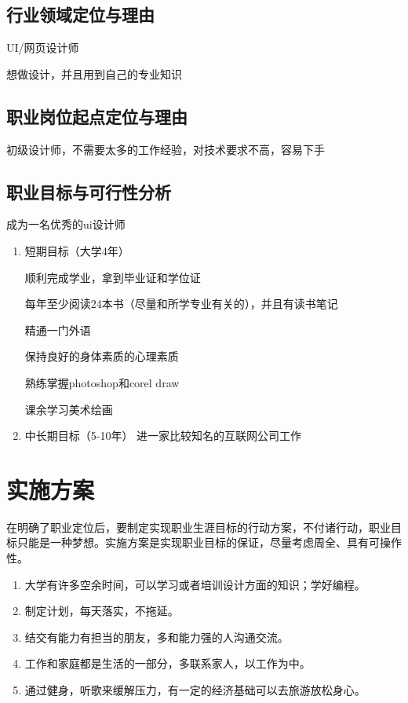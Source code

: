 \documentclass{article}
\begin{document}
\subsection{行业领域定位与理由}
UI/网页设计师\par
想做设计，并且用到自己的专业知识
\par
\subsection{职业岗位起点定位与理由}
初级设计师，不需要太多的工作经验，对技术要求不高，容易下手
\par
\subsection{职业目标与可行性分析}
成为一名优秀的ui设计师
\par

\begin{enumerate}[(1)]
	\item 短期目标（大学4年）\par
顺利完成学业，拿到毕业证和学位证\par
每年至少阅读24本书（尽量和所学专业有关的），并且有读书笔记\par
精通一门外语\par
保持良好的身体素质的心理素质\par	
熟练掌握photoshop和corel draw\par
课余学习美术绘画\par	
	
	
	\item 中长期目标（5-10年）
	进一家比较知名的互联网公司工作
	
	
	
	
	
\end{enumerate}



\section{实施方案}
在明确了职业定位后，要制定实现职业生涯目标的行动方案，不付诸行动，职业目标只能是一种梦想。实施方案是实现职业目标的保证，尽量考虑周全、具有可操作性。\par

\begin{enumerate}[1、]
	\item 大学有许多空余时间，可以学习或者培训设计方面的知识；学好编程。
	\item 制定计划，每天落实，不拖延。
	\item 结交有能力有担当的朋友，多和能力强的人沟通交流。
	\item 工作和家庭都是生活的一部分，多联系家人，以工作为中。
	\item 通过健身，听歌来缓解压力，有一定的经济基础可以去旅游放松身心。
\end{enumerate}
\par 
\end{document}
